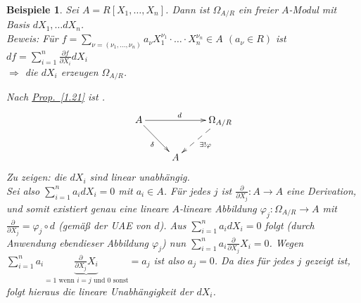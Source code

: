 \documentclass[a4paper,12pt]{scrbook}
\theoremstyle{break}
\theoremstyle{nonumberbreak}
\newtheorem{nnBsp}{Beispiele}
\theoremstyle{nonumberplain}
\newcommand{\myref}[2]{%
\hyperref[#2]{#1~\ref*{#2}}%
}
\DeclareMathOperator{\Hom}{Hom}
\begin{document}
\begin{nnBsp}
  Sei $A = R[X_1, \dots , X_n]$. Dann ist $\Omega_{A/R}$ ein freier $A$-Modul mit Basis
  $d X_1, \dots d X_n$.\\
  \textit{Beweis:} Für $f = \sum_{\nu = (\nu_1, \dots , \nu_n)} a_{\nu} X_1^{\nu_1} \cdot \dots \cdot X_n^{\nu_n} \in A$ $(a_{\nu} \in R)$ ist $d f = \sum_{i=1}^n \frac{\partial f}{\partial X_i} d X_i$\\
  $\Rightarrow$ die $d X_i$ erzeugen $\Omega_{A/R}$.

  Nach \myref{Prop.}{1.21} ist \fbox{$\mbox{Der}_R(A,A) = \Hom_A(\Omega_{A/R},A)$}.
  \[
    \begin{xy}
      \xymatrix{
         A \ar[rr]^{d} \ar[rd]_{\delta}  &     &  \Omega_{A/R} \ar@{-->}[dl]^{\exists!\varphi}  \\
                                         &  A  &
      }
    \end{xy}
  \]
  Zu zeigen: die $dX_i$ sind linear unabhängig.\\
  Sei also $\sum_{i = 1}^n a_i d X_i = 0$ mit $a_i \in A$. Für jedes $j$ ist
  $\frac{\partial}{\partial X_j} : A \to A$ eine Derivation, und somit existiert genau
  eine lineare $A$-lineare Abbildung $\varphi_j : \Omega_{A/R} \to A$ mit
  $\frac{\partial}{\partial X_j} = \varphi_j \circ d$ (gemäß der UAE von $d$).
  Aus $\sum_{i = 1}^n a_i d X_i = 0$ folgt (durch Anwendung ebendieser
  Abbildung $\varphi_j$) nun $\sum_{i = 1}^n a_i \frac{\partial}{\partial X_j} X_i = 0$.
  Wegen $\sum_{i = 1}^n a_i \underbrace{\frac{\partial}{\partial X_j} X_i}_{=1\mbox{ wenn }i=j\mbox{ und }0\mbox{ sonst}}
  = a_j$ ist also $a_j = 0$. Da dies für jedes $j$ gezeigt ist, folgt hieraus die
  lineare Unabhängigkeit der $dX_i$.
\end{nnBsp}
\end{document}

